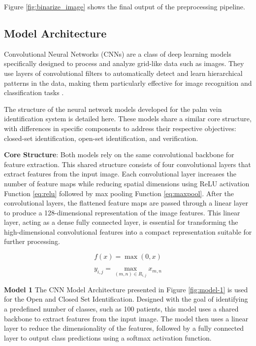 \begin{enumerate}
    Figure \ref{fig:binarize_image} shows the final output of the preprocessing pipeline.
\end{enumerate}

\subsection{Model Architecture}
Convolutional Neural Networks (CNNs) are a class of deep learning models specifically designed to process and analyze grid-like data such as images. They use layers of convolutional filters to automatically detect and learn hierarchical patterns in the data, making them particularly effective for image recognition and classification tasks \cite{726791}.

The structure of the neural network models developed for the palm vein identification system is detailed here. These models share a similar core structure, with differences in specific components to address their respective objectives: closed-set identification, open-set identification, and verification.

\textbf{Core Structure}: Both models rely on the same convolutional backbone for feature extraction. This shared structure consists of four convolutional layers that extract features from the input image. Each convolutional layer increases the number of feature maps while reducing spatial dimensions using ReLU activation Function \ref{eq:relu} followed by max pooling Function \ref{eq:maxpool}. After the convolutional layers, the flattened feature maps are passed through a linear layer to produce a 128-dimensional representation of the image features. This linear layer, acting as a dense fully connected layer, is essential for transforming the high-dimensional convolutional features into a compact representation suitable for further processing.

\begin{equation}
    f(x) = \max(0, x)
    \label{eq:relu}
\end{equation}

\begin{equation}
    y_{i,j} = \max_{(m,n) \in R_{i,j}} x_{m,n}
    \label{eq:maxpool}
\end{equation}

\textbf{Model 1} The CNN Model Architecture presented in Figure \ref{fig:model-1} is used for the Open and Closed Set Identification. Designed with the goal of identifying a predefined number of classes, such as 100 patients, this model uses a shared backbone to extract features from the input image. The model then uses a linear layer to reduce the dimensionality of the features, followed by a fully connected layer to output class predictions using a softmax activation function. 

